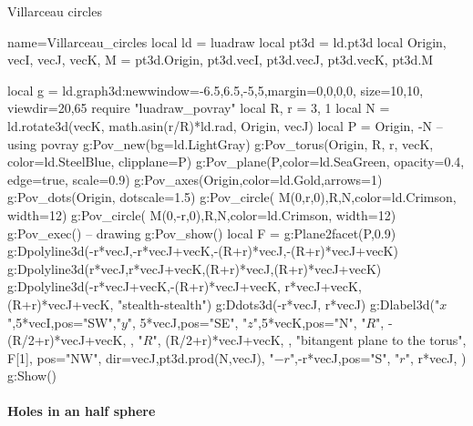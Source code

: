 \begin{demo}{Villarceau circles}
\begin{luadraw}{name=Villarceau_circles}
local ld = luadraw
local pt3d = ld.pt3d
local Origin, vecI, vecJ, vecK, M = pt3d.Origin, pt3d.vecI, pt3d.vecJ, pt3d.vecK, pt3d.M

local g = ld.graph3d:new{window={-6.5,6.5,-5,5},margin={0,0,0,0}, size={10,10}, viewdir={20,65}}
require "luadraw_povray"
local R, r = 3, 1
local N = ld.rotate3d(vecK, math.asin(r/R)*ld.rad, {Origin, vecJ})
local P = {Origin, -N}
-- using povray
g:Pov_new({bg=ld.LightGray})
g:Pov_torus(Origin, R, r, vecK, {color=ld.SteelBlue, clipplane=P})
g:Pov_plane(P,{color=ld.SeaGreen, opacity=0.4, edge=true, scale=0.9})
g:Pov_axes(Origin,{color=ld.Gold,arrows=1})
g:Pov_dots(Origin, {dotscale=1.5})
g:Pov_circle( M(0,r,0),R,N,{color=ld.Crimson, width=12})
g:Pov_circle( M(0,-r,0),R,N,{color=ld.Crimson, width=12})
g:Pov_exec()
-- drawing
g:Pov_show()
local F = g:Plane2facet(P,0.9)
g:Dpolyline3d({{-r*vecJ,-r*vecJ+vecK},{-(R+r)*vecJ,-(R+r)*vecJ+vecK}})
g:Dpolyline3d({{r*vecJ,r*vecJ+vecK},{(R+r)*vecJ,(R+r)*vecJ+vecK}})
g:Dpolyline3d({{-r*vecJ+vecK,-(R+r)*vecJ+vecK}, {r*vecJ+vecK,(R+r)*vecJ+vecK}}, "stealth-stealth")
g:Ddots3d({-r*vecJ, r*vecJ})
g:Dlabel3d("$x$",5*vecI,{pos="SW"},"$y$", 5*vecJ,{pos="SE"}, "$z$",5*vecK,{pos="N"},
  "$R$", -(R/2+r)*vecJ+vecK, {}, "$R$", (R/2+r)*vecJ+vecK, {},
  "bitangent plane to the torus", F[1], {pos="NW", dir={vecJ,pt3d.prod(N,vecJ)}},
  "$-r$",-r*vecJ,{pos="S"}, "$r$", r*vecJ,{} )
g:Show()
\end{luadraw}
\end{demo}

\paragraph{Holes in an half sphere}

